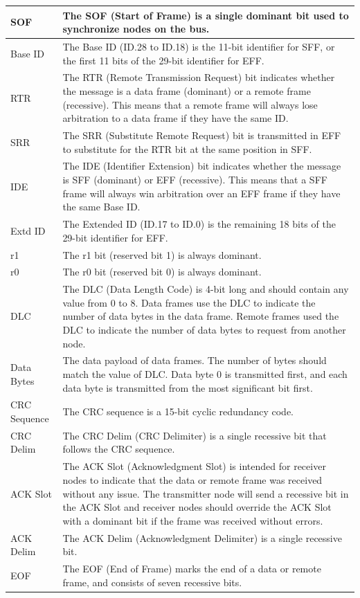 \begin{longtable}[c]{|p{3.5cm}|p{12cm}|}
    SOF & The SOF (Start of Frame) is a single dominant bit used to synchronize nodes on the bus.
          \\\hline
    Base ID & The Base ID (ID.28 to ID.18) is the 11-bit identifier for SFF, or the first 11 bits of the 29-bit identifier for EFF.
          \\\hline
    \label{table_item:canframe_rtr}{RTR} & The RTR (Remote Transmission Request) bit indicates whether the message is a data frame (dominant) or a remote frame (recessive). This means that a remote frame will always lose arbitration to a data frame if they have the same ID.                                                    \\\hline
    \label{table_item:canframe_srr}{SRR} & The SRR (Substitute Remote Request) bit is transmitted in EFF to substitute for the RTR bit at the same position in SFF.                       
           \\\hline
    IDE & The IDE (Identifier Extension) bit indicates whether the message is SFF (dominant) or EFF (recessive). This means that a SFF frame will always win arbitration over an EFF frame if they have the same Base ID.
            \\\hline
    Extd ID & The Extended ID (ID.17 to ID.0) is the remaining 18 bits of the 29-bit identifier for EFF.
            \\\hline
    r1 & The r1 bit (reserved bit 1) is always dominant.
             \\\hline 
    r0 & The r0 bit (reserved bit 0) is always dominant.
             \\\hline
    DLC & The DLC (Data Length Code) is 4-bit long and should contain any value from 0 to 8. Data frames use the DLC to indicate the number of data bytes in the data frame. Remote frames used the DLC to indicate the number of data bytes to request from another node. 
             \\\hline
    Data Bytes & The data payload of data frames. The number of bytes should match the value of DLC. Data byte 0 is transmitted first, and each data byte is transmitted from the most significant bit first.
             \\\hline
    CRC Sequence & The CRC sequence is a 15-bit cyclic redundancy code.
             \\\hline
    CRC Delim & The CRC Delim (CRC Delimiter) is a single recessive bit that follows the CRC sequence.
              \\\hline
    ACK Slot & The ACK Slot (Acknowledgment Slot) is intended for receiver nodes to indicate that the data or remote frame was received without any issue. The transmitter node will send a recessive bit in the ACK Slot and receiver nodes should override the ACK Slot with a dominant bit if the frame was received without errors.
              \\\hline
    ACK Delim & The ACK Delim (Acknowledgment Delimiter) is a single recessive bit.
              \\\hline
    EOF & The EOF (End of Frame) marks the end of a data or remote frame, and consists of seven recessive bits.
              \\\hline
\end{longtable}
